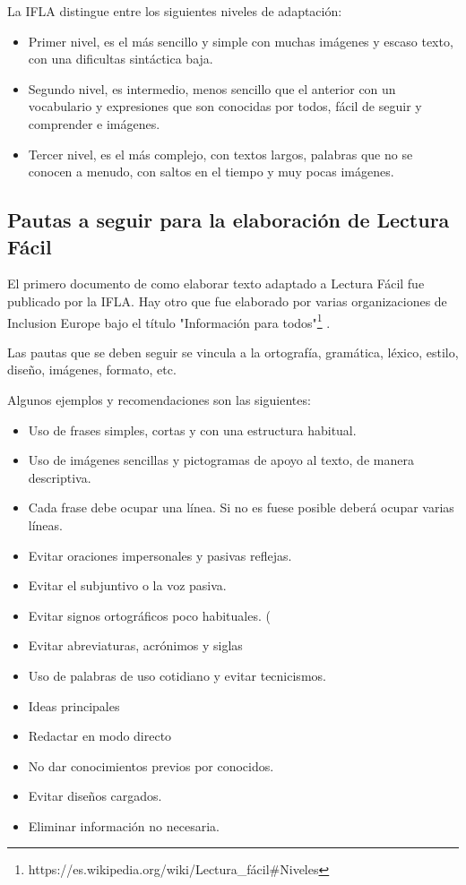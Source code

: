 La IFLA distingue entre los siguientes niveles de adaptación:
\begin{itemize}
	\item Primer nivel, es el más sencillo y simple con muchas imágenes y escaso texto, con una dificultas sintáctica baja.
\item Segundo nivel, es intermedio, menos sencillo que el anterior con un vocabulario y expresiones que son conocidas por todos, fácil de seguir y comprender e imágenes.
\item Tercer nivel, es el más complejo, con textos largos, palabras que no se conocen a menudo, con saltos en el tiempo y muy pocas imágenes. 
 \end{itemize}
\subsection{Pautas a seguir para la elaboración de Lectura Fácil}
 El primero documento de como elaborar texto adaptado a Lectura Fácil fue publicado por la IFLA. Hay otro que fue elaborado por varias organizaciones de Inclusion Europe bajo el título "Información para todos"\footnote{https://es.wikipedia.org/wiki/Lectura\_fácil\#Niveles} .
 
 Las pautas que se deben seguir se vincula a la ortografía, gramática, léxico, estilo, diseño, imágenes, formato, etc. 
 
 Algunos ejemplos y recomendaciones son las siguientes:
 \begin{itemize}
 \item Uso de frases simples, cortas y con una estructura habitual.
 \item Uso de imágenes sencillas y pictogramas de apoyo al texto, de manera descriptiva.
 \item Cada frase debe ocupar una línea. Si no es fuese posible deberá ocupar varias líneas.
 \item Evitar oraciones impersonales y pasivas reflejas.
 \item Evitar el subjuntivo o la voz pasiva.
 \item Evitar signos ortográficos poco habituales. (%
 \item Evitar abreviaturas, acrónimos y siglas
 \item Uso de palabras de uso cotidiano y evitar tecnicismos.
 \item Ideas principales
 \item Redactar en modo directo
 \item No dar conocimientos previos por conocidos.
 \item Evitar diseños cargados.
  \item Eliminar información no necesaria.

\end{itemize}
